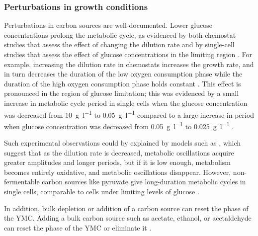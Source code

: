 \subsubsection{Perturbations in growth conditions}
\label{subsubsec:intro-ymc-perturbations-nutrient}


Perturbations in carbon sources are well-documented.
Lower glucose concentrations prolong the metabolic cycle, as evidenced by both chemostat studies that assess the effect of changing the dilution rate \parencite{burnettiCellCycleStart2016, oneillEukaryoticCellBiology2020} and by single-cell studies that assess the effect of glucose concentrations in the limiting region \parencite{papagiannakisAutonomousMetabolicOscillations2017}.
For example, increasing the dilution rate in chemostats increases the growth rate, and in turn decreases the duration of the low oxygen consumption phase while the duration of the high oxygen consumption phase holds constant \parencite{slavovCouplingGrowthRate2011,oneillEukaryoticCellBiology2020}.
This effect is pronounced in the region of glucose limitation; this was evidenced by a small increase in metabolic cycle period in single cells when the glucose concentration was decreased from \SI{10}{\gram~\litre^{-1}} to \SI{0.05}{\gram~\litre^{-1}} compared to a large increase in period when glucose concentration was decreased from \SI{0.05}{\gram~\litre^{-1}} to \SI{0.025}{\gram~\litre^{-1}} \parencite{papagiannakisAutonomousMetabolicOscillations2017}.

Such experimental observations could by explained by models such as \textcite{jonesCyberneticModelGrowth1999}, which suggest that as the dilution rate is decreased, metabolic oscillations acquire greater amplitudes and longer periods, but if it is low enough, metabolism becomes entirely oxidative, and metabolic oscillations disappear.
However, non-fermentable carbon sources like pyruvate give long-duration metabolic cycles in single cells, comparable to cells under limiting levels of glucose \parencite{papagiannakisAutonomousMetabolicOscillations2017}.

In addition, bulk depletion or addition of a carbon source can reset the phase of the YMC\@.
Adding a bulk carbon source such as acetate, ethanol, or acetaldehyde can reset the phase of the YMC \parencite{kuangMsn2RegulateExpression2017, krishnaMinimalPushPull2018} or eliminate it \parencite{jonesCyberneticModelGrowth1999}.

